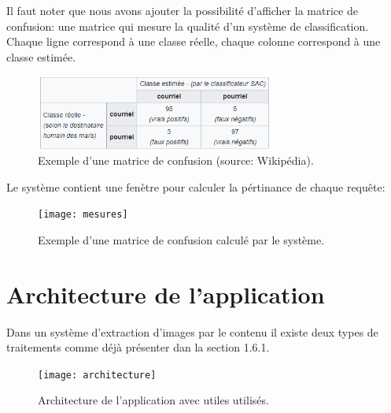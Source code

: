 Il faut noter que nous avons ajouter la possibilité d'afficher la matrice de confusion: une matrice qui mesure la qualité d'un système de classification. Chaque ligne correspond à une classe réelle, chaque colonne correspond à une classe estimée. 
\begin{figure}[H]
	\centering
	\includegraphics[width=0.7\textwidth]{Figures/cm.png} 
	\caption{Exemple d'une matrice de confusion (source: Wikipédia).}
\end{figure}
Le système contient une fenètre pour calculer la pértinance de chaque requête:
\begin{figure}[H]
	\centering
	\texttt{[image: mesures]} 
	\caption{Exemple d'une matrice de confusion calculé par le système.}
\end{figure}
\section{Architecture de l’application}
Dans un système d’extraction d’images par le contenu il existe deux types de traitements comme déjà présenter dan la section 1.6.1.

\begin{figure}[H]
	\centering
	\texttt{[image: architecture]} 
	\caption{Architecture de l’application avec utiles utilisés.}
\end{figure}
